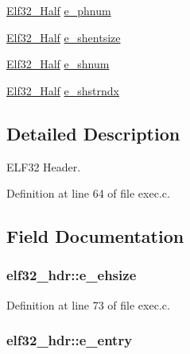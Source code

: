 \begin{DoxyCompactItemize}
\item 
\hyperlink{exec_8c_a2ff0787d7d1bae0f251192806a2974ca}{Elf32\+\_\+\+Half} \hyperlink{structelf32__hdr_ae97c82a1bab1e0bf6de2d4ad0f6eef79}{e\+\_\+phnum}
\item 
\hyperlink{exec_8c_a2ff0787d7d1bae0f251192806a2974ca}{Elf32\+\_\+\+Half} \hyperlink{structelf32__hdr_a8ca2eaada4cff245f41faa852a4a248e}{e\+\_\+shentsize}
\item 
\hyperlink{exec_8c_a2ff0787d7d1bae0f251192806a2974ca}{Elf32\+\_\+\+Half} \hyperlink{structelf32__hdr_ab7d153e79bf2dca73049268f1fcd79c6}{e\+\_\+shnum}
\item 
\hyperlink{exec_8c_a2ff0787d7d1bae0f251192806a2974ca}{Elf32\+\_\+\+Half} \hyperlink{structelf32__hdr_afd7ed18333923147918975fdfa4ee99a}{e\+\_\+shstrndx}
\end{DoxyCompactItemize}


\subsection{Detailed Description}
E\+L\+F32 Header. 

Definition at line 64 of file exec.\+c.



\subsection{Field Documentation}
\hypertarget{structelf32__hdr_a3d3364b74b882c7383f11a17ddda34b2}{
\subsubsection[{e\+\_\+ehsize}]{ elf32\+\_\+hdr\+::e\+\_\+ehsize}}\label{structelf32__hdr_a3d3364b74b882c7383f11a17ddda34b2}


Definition at line 73 of file exec.\+c.

\hypertarget{structelf32__hdr_aebf266c7454956ac9aca091c837f6c14}{
\subsubsection[{e\+\_\+entry}]{ elf32\+\_\+hdr\+::e\+\_\+entry}}\label{structelf32__hdr_aebf266c7454956ac9aca091c837f6c14}


